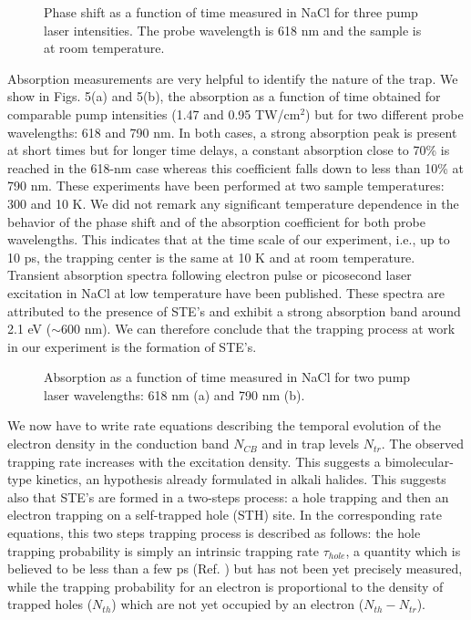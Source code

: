 \documentclass[aps,prb,reprint]{revtex4-2}
\begin{document}
\begin{figure}[ht]
    \centering
    \caption{Phase shift as a function of time measured in NaCl for three pump laser intensities. The probe wavelength is 618 nm and the sample is at room temperature.}
    \label{fig:nacl_time}
\end{figure}

Absorption measurements are very helpful to identify the nature of the trap. We show in Figs. 5(a) and 5(b), the absorption as a function of time obtained for comparable pump intensities (1.47 and 0.95 TW/cm$^2$) but for two different probe wavelengths: 618 and 790 nm. In both cases, a strong absorption peak is present at short times but for longer time delays, a constant absorption close to 70\% is reached in the 618-nm case whereas this coefficient falls down to less than 10\% at 790 nm. These experiments have been performed at two sample temperatures: 300 and 10 K. We did not remark any significant temperature dependence in the behavior of the phase shift and of the absorption coefficient for both probe wavelengths. This indicates that at the time scale of our experiment, i.e., up to 10 ps, the trapping center is the same at 10 K and at room temperature. Transient absorption spectra following electron pulse or picosecond laser excitation in NaCl at low temperature have been published.\cite{15,20} These spectra are attributed to the presence of STE's and exhibit a strong absorption band around 2.1 eV ($\sim 600$ nm). We can therefore conclude that the trapping process at work in our experiment is the formation of STE's.

\begin{figure}[ht]
    \centering
    \caption{Absorption as a function of time measured in NaCl for two pump laser wavelengths: 618 nm (a) and 790 nm (b).}
    \label{fig:nacl_abs}
\end{figure}

We now have to write rate equations describing the temporal evolution of the electron density in the conduction band $N_{CB}$ and in trap levels $N_{tr}$. The observed trapping rate increases with the excitation density. This suggests a bimolecular-type kinetics, an hypothesis already formulated in alkali halides.\cite{21,22} This suggests also that STE's are formed in a two-steps process: a hole trapping and then an electron trapping on a self-trapped hole (STH) site. In the corresponding rate equations, this two steps trapping process is described as follows: the hole trapping probability is simply an intrinsic trapping rate $\tau_{hole}$, a quantity which is believed to be less than a few ps (Ref. \cite{8}) but has not been yet precisely measured, while the trapping probability for an electron is proportional to the density of trapped holes ($N_{th}$) which are not yet occupied by an electron ($N_{th} - N_{tr}$).
\end{document}
